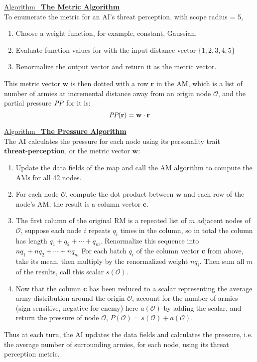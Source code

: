 \documentclass[12pt]{article}  %
\newcommand{\algtitle}[1]{\underline{Algorithm \ {\bf #1}} \vspace*{1mm}\\}
\begin{document}
\algtitle{The Metric Algorithm}
To enumerate the metric for an AI's threat perception, with scope radius = 5,
\begin{enumerate}
	\item Choose a weight function, for example, constant, Gaussian,
	\item Evaluate function values for with the input distance vector $\{1,2,3,4,5\}$
	\item Renormalize the output vector and return it as the metric vector.
\end{enumerate}

This metric vector $\mathbf{w}$ is then dotted with a row $\mathbf{r}$ in the AM, which is a list of number of armies at incremental distance away from an origin node $\mathcal{O}$, and the partial pressure $\emph{PP}$ for it is:
$$\emph{PP}(\mathbf{r}) = \mathbf{w} \cdot \mathbf{r}$$


\algtitle{The Pressure Algorithm}
The AI calculates the pressure for each node using its personality trait $\textbf{threat-perception}$, or the metric vector $\mathbf{w}$:
\begin{enumerate}
	\item Update the data fields of the map and call the AM algorithm to compute the AMs for all 42 nodes.
	\item For each node $\mathcal{O}$, compute the dot product between $\mathbf{w}$ and each row of the node's AM; the result is a column vector $\mathbf{c}$.
	\item The first column of the original RM is a repeated list of $m$ adjacent nodes of $\mathcal{O}$, suppose each node $i$ repeats $q_i$ times in the column, so in total the column has length $q_1 + q_2 + \cdots + q_m$. Renormalize this sequence into $nq_1 + nq_2 + \cdots + nq_m$ For each batch $q_i$ of the column vector $\mathbf{c}$ from above, take its mean, then multiply by the renormalized weight $nq_i$. Then sum all $m$ of the results, call this scalar $s(\mathcal{O})$.
	\item Now that the column $\mathbf{c}$ has been reduced to a scalar representing the average army distribution around the origin $\mathcal{O}$, account for the number of armies (sign-sensitive, negative for enemy) here $a(\mathcal{O})$ by adding the scalar, and return the pressure of node $\mathcal{O}$, $P(\mathcal{O}) = s(\mathcal{O}) + a(\mathcal{O})$.
\end{enumerate}


Thus at each turn, the AI updates the data fields and calculates the pressure, i.e. the average number of surrounding armies, for each node, using its threat perception metric.
\end{document}
